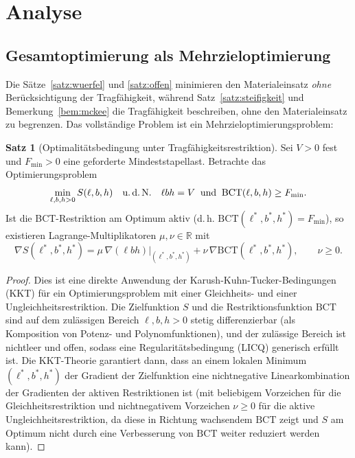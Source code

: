 ﻿\documentclass[a4paper,12pt]{article}
\theoremstyle{definition}
\newtheorem{satz}{Satz}
\begin{document}
\section{Analyse}

\subsection{Gesamtoptimierung als Mehrzieloptimierung}

Die Sätze~\ref{satz:wuerfel} und \ref{satz:offen} minimieren den Materialeinsatz
\emph{ohne} Berücksichtigung der Tragfähigkeit, während Satz~\ref{satz:steifigkeit}
und Bemerkung~\ref{bem:mckee} die Tragfähigkeit beschreiben, ohne den
Materialeinsatz zu begrenzen. Das vollständige Problem ist ein
Mehrzieloptimierungsproblem:

\begin{satz}[Optimalitätsbedingung unter Tragfähigkeitsrestriktion]
	\label{satz:lagrange}
	Sei $V > 0$ fest und $F_{\min} > 0$ eine geforderte Mindeststapellast.
	Betrachte das Optimierungsproblem
	\[
		\min_{\ell,b,h > 0} S(\ell,b,h) \quad \text{u.\,d.\,N.} \quad
		\ell b h = V \;\;\text{und}\;\; \mathrm{BCT}(\ell,b,h) \geq F_{\min}.
	\]
	Ist die BCT-Restriktion am Optimum aktiv (d.\,h.
	$\mathrm{BCT}(\ell^\ast,b^\ast,h^\ast) = F_{\min}$), so existieren
	Lagrange-Multiplikatoren $\mu, \nu \in \mathbb{R}$ mit
	\[
		\nabla S(\ell^\ast,b^\ast,h^\ast)
		= \mu \,\nabla(\ell b h)\big|_{(\ell^\ast,b^\ast,h^\ast)}
		+ \nu \,\nabla \mathrm{BCT}(\ell^\ast,b^\ast,h^\ast),
		\qquad \nu \geq 0.
	\]
\end{satz}

\begin{proof}
	Dies ist eine direkte Anwendung der Karush-Kuhn-Tucker-Bedingungen (KKT)
	für ein Optimierungsproblem mit einer Gleichheits- und einer
	Ungleichheitsrestriktion. Die Zielfunktion $S$ und die Restriktionsfunktion
	$\mathrm{BCT}$ sind auf dem zulässigen Bereich $\ell,b,h>0$ stetig
	differenzierbar (als Komposition von Potenz- und Polynomfunktionen), und
	der zulässige Bereich ist nichtleer und offen, sodass eine
	Regularitätsbedingung (LICQ) generisch erfüllt ist. Die KKT-Theorie
	garantiert dann, dass an einem lokalen Minimum $(\ell^\ast,b^\ast,h^\ast)$
	der Gradient der Zielfunktion eine nichtnegative Linearkombination der
	Gradienten der aktiven Restriktionen ist (mit beliebigem Vorzeichen für die
	Gleichheitsrestriktion und nichtnegativem Vorzeichen $\nu \geq 0$ für die
	aktive Ungleichheitsrestriktion, da diese in Richtung wachsendem
	$\mathrm{BCT}$ zeigt und $S$ am Optimum nicht durch eine Verbesserung von
	$\mathrm{BCT}$ weiter reduziert werden kann).
\end{proof}
\end{document}
